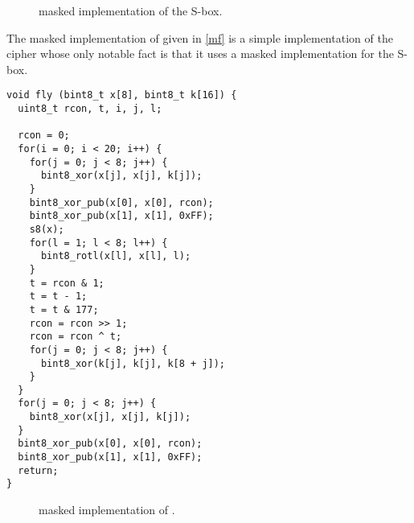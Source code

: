 \vspace{-1mm}
\begin{figure}[ht]
\caption{\C masked implementation of the \littlunOne S-box\label{ms}.} 
\end{figure}

\newpage

The masked implementation of \fly given in \autoref{mf} is a simple implementation of the
cipher whose only notable fact is that it uses a masked implementation for the S-box.

\begin{verbatim}
void fly (bint8_t x[8], bint8_t k[16]) {
  uint8_t rcon, t, i, j, l;

  rcon = 0;
  for(i = 0; i < 20; i++) {
    for(j = 0; j < 8; j++) {
      bint8_xor(x[j], x[j], k[j]);
    }
    bint8_xor_pub(x[0], x[0], rcon);
    bint8_xor_pub(x[1], x[1], 0xFF);
    s8(x);
    for(l = 1; l < 8; l++) {
      bint8_rotl(x[l], x[l], l);
    }
    t = rcon & 1;
    t = t - 1;
    t = t & 177;
    rcon = rcon >> 1;
    rcon = rcon ^ t;
    for(j = 0; j < 8; j++) {
      bint8_xor(k[j], k[j], k[8 + j]);
    }
  }
  for(j = 0; j < 8; j++) {
    bint8_xor(x[j], x[j], k[j]);
  }
  bint8_xor_pub(x[0], x[0], rcon);
  bint8_xor_pub(x[1], x[1], 0xFF);
  return;
}
\end{verbatim}
\begin{figure}[ht]
\caption{\C masked implementation of \fly.\label{mf}}
\end{figure}
